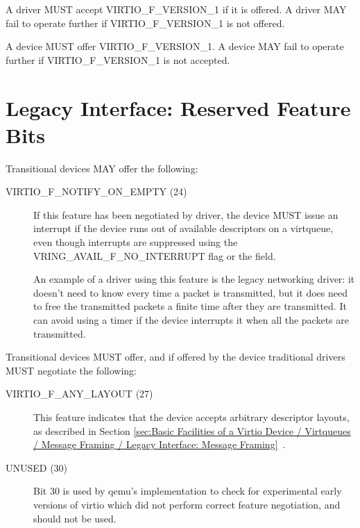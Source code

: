 
A driver MUST accept VIRTIO_F_VERSION_1 if it is offered.  A driver
MAY fail to operate further if VIRTIO_F_VERSION_1 is not offered.


A device MUST offer VIRTIO_F_VERSION_1.  A device MAY fail to operate further
if VIRTIO_F_VERSION_1 is not accepted.

\section{Legacy Interface: Reserved Feature Bits}\label{sec:Reserved Feature Bits / Legacy Interface: Reserved Feature Bits}

Transitional devices MAY offer the following:
\begin{description}
\item[VIRTIO_F_NOTIFY_ON_EMPTY (24)] If this feature
  has been negotiated by driver, the device MUST issue
  an interrupt if the device runs
  out of available descriptors on a virtqueue, even though
  interrupts are suppressed using the VRING_AVAIL_F_NO_INTERRUPT
  flag or the  field.
\begin{note}
  An example of a driver using this feature is the legacy
  networking driver: it doesn't need to know every time a packet
  is transmitted, but it does need to free the transmitted
  packets a finite time after they are transmitted. It can avoid
  using a timer if the device interrupts it when all the packets
  are transmitted.
\end{note}
\end{description}

Transitional devices MUST offer, and if offered by the device
traditional drivers MUST negotiate the following:
\begin{description}
\item[VIRTIO_F_ANY_LAYOUT (27)] This feature indicates that the device
  accepts arbitrary descriptor layouts, as described in Section
  \ref{sec:Basic Facilities of a Virtio Device / Virtqueues / Message Framing / Legacy Interface: Message Framing}~.

\item[UNUSED (30)] Bit 30 is used by qemu's implementation to check
  for experimental early versions of virtio which did not perform
  correct feature negotiation, and should not be used.
\end{description}
